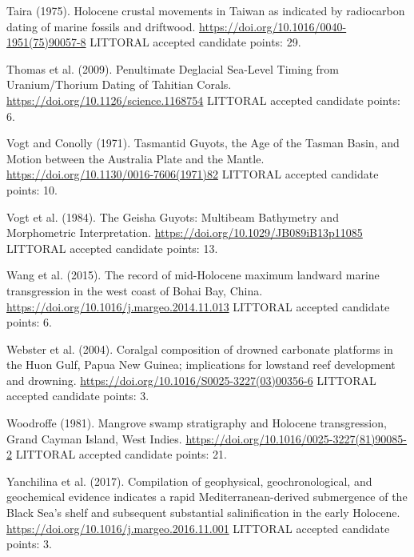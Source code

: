 \documentclass[twocolumn,10pt]{article}
\begin{document}
\begin{thebibliography}{}
Taira (1975).
\newblock Holocene crustal movements in Taiwan as indicated by radiocarbon dating of marine fossils and driftwood.
\newblock \url{https://doi.org/10.1016/0040-1951(75)90057-8}
\newblock LITTORAL accepted candidate points: 29.

Thomas et al. (2009).
\newblock Penultimate Deglacial Sea-Level Timing from Uranium/Thorium Dating of Tahitian Corals.
\newblock \url{https://doi.org/10.1126/science.1168754}
\newblock LITTORAL accepted candidate points: 6.

Vogt and Conolly (1971).
\newblock Tasmantid Guyots, the Age of the Tasman Basin, and Motion between the Australia Plate and the Mantle.
\newblock \url{https://doi.org/10.1130/0016-7606(1971)82}
\newblock LITTORAL accepted candidate points: 10.

Vogt et al. (1984).
\newblock The Geisha Guyots: Multibeam Bathymetry and Morphometric Interpretation.
\newblock \url{https://doi.org/10.1029/JB089iB13p11085}
\newblock LITTORAL accepted candidate points: 13.

Wang et al. (2015).
\newblock The record of mid-Holocene maximum landward marine transgression in the west coast of Bohai Bay, China.
\newblock \url{https://doi.org/10.1016/j.margeo.2014.11.013}
\newblock LITTORAL accepted candidate points: 6.

Webster et al. (2004).
\newblock Coralgal composition of drowned carbonate platforms in the Huon Gulf, Papua New Guinea; implications for lowstand reef development and drowning.
\newblock \url{https://doi.org/10.1016/S0025-3227(03)00356-6}
\newblock LITTORAL accepted candidate points: 3.

Woodroffe (1981).
\newblock Mangrove swamp stratigraphy and Holocene transgression, Grand Cayman Island, West Indies.
\newblock \url{https://doi.org/10.1016/0025-3227(81)90085-2}
\newblock LITTORAL accepted candidate points: 21.

Yanchilina et al. (2017).
\newblock Compilation of geophysical, geochronological, and geochemical evidence indicates a rapid Mediterranean-derived submergence of the Black Sea's shelf and subsequent substantial salinification in the early Holocene.
\newblock \url{https://doi.org/10.1016/j.margeo.2016.11.001}
\newblock LITTORAL accepted candidate points: 3.


\end{thebibliography}
\end{document}
